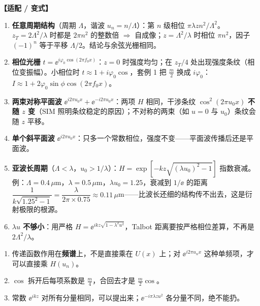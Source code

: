 \noindent\textbf{【适配 / 变式】}
\begin{enumerate}
\item \textbf{任意周期结构}（周期 $\Lambda$，谐波 $u_n=n/\Lambda$）：第 $n$ 级相位 $\pi\lambda zn^2/\Lambda^2$。$z_T=2\Lambda^2/\lambda$ 时都是 $2\pi n^2$ 的整数倍 $\Rightarrow$ 自成像；$z=\Lambda^2/\lambda$ 时相位 $\pi n^2$，因子 $(-1)^n$ 等于平移 $\Lambda/2$。结论与余弦光栅相同。
\item \textbf{相位光栅} $t=\ee^{i\varphi_0\cos(2\pi f_0x)}$：$z=0$ 时强度均匀；在 $z_T/4$ 处出现强度条纹（相位变振幅）。小相位时 $t\approx1+i\varphi_0\cos$，套例 1 把 $\frac m2$ 换成 $i\varphi_0$：$I\approx1+2\varphi_0\sin\phi\cos(2\pi f_0x)$。
\item \textbf{两束对称平面波} $\ee^{i2\pi u_0x}+\ee^{-i2\pi u_0x}$：两项 $H$ 相同，干涉条纹 $\cos^2(2\pi u_0x)$ \textbf{不随 $z$ 变}（SIM 照明条纹稳定的原因）；不对称的两束（如 $u=0$ 与 $u_0$）条纹会随 $z$ 平移。
\item \textbf{单个斜平面波} $\ee^{i2\pi u_0x}$：只多一个常数相位，强度不变——平面波传播后还是平面波。
\item \textbf{亚波长周期}（$\Lambda<\lambda$，$u_0>1/\lambda$）：$H=\exp\!\left[-kz\sqrt{(\lambda u_0)^2-1}\right]$ 指数衰减。例：$\Lambda=0.4\,\mu$m，$\lambda=0.5\,\mu$m，$\lambda u_0=1.25$，衰减到 $1/\ee$ 的距离 $\dfrac{1}{k\sqrt{1.25^2-1}}=\dfrac{\lambda}{2\pi\times0.75}\approx0.11\,\mu$m——比波长还细的结构传不出去，这是衍射极限的根源。
\item \textbf{$\lambda u$ 不够小}：用严格 $H=\ee^{ikz\sqrt{1-\lambda^2u^2}}$，Talbot 距离要按严格相位差算，不再是 $2\Lambda^2/\lambda$。
\end{enumerate}

\begin{warn}[角谱题易错]
\begin{enumerate}
\item 传递函数作用在\textbf{频谱}上，不是直接乘在 $U(x)$ 上；对 $\ee^{i2\pi u_nx}$ 这种单频项，才可以直接乘 $H(u_n)$。
\item $\cos$ 拆开后每项系数是 $\frac m4$，合回去才是 $\frac m2\cos$。
\item 常数 $\ee^{ikz}$ 对所有分量相同，可以提出来；$\ee^{-i\pi\lambda zu^2}$ 各分量不同，绝不能扔。
\end{enumerate}
\end{warn}

